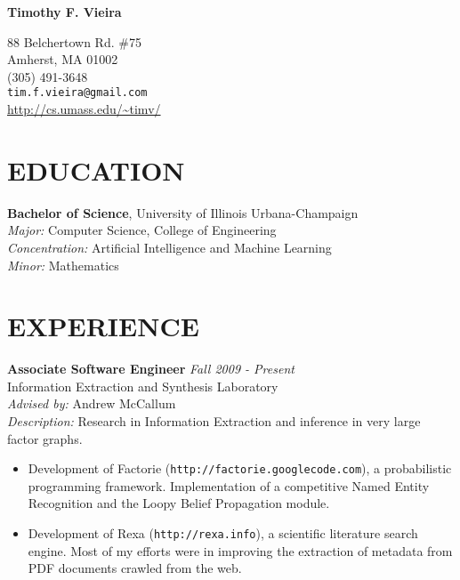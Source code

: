 \documentclass{report}
\newcommand{\centerheader}[1]{\moveleft.5\hoffset\centerline{#1}}
\begin{document}
{
  {\vskip 0.2in}
  {\Large \bf Timothy F. Vieira} \\
  \vspace{-10pt}
  \par{88 Belchertown Rd. \#75 \\ 
    Amherst, MA 01002} \\
  (305) 491-3648 \\
  \texttt{tim.f.vieira@gmail.com} \\
  \url{http://cs.umass.edu/~timv/} \\
}

{\vskip 0.1in}



\section*{EDUCATION} 
{\bf Bachelor of Science}, University of Illinois Urbana-Champaign \\
{\sl Major:} Computer Science, College of Engineering \\
{\sl Concentration:} Artificial Intelligence and Machine Learning \\
{\sl Minor:} Mathematics

\section*{EXPERIENCE}
{\bf Associate Software Engineer} \hfill {\it Fall 2009 - Present} \\
Information Extraction and Synthesis Laboratory \\
{\sl Advised by:} Andrew McCallum \\
{\sl Description:} Research in Information Extraction and inference in very large factor graphs. 
\begin{itemize}
\item Development of Factorie (\texttt{http://factorie.googlecode.com}), a probabilistic programming framework. Implementation of a competitive Named Entity Recognition and the Loopy Belief Propagation module. 
\item Development of Rexa (\texttt{http://rexa.info}), a scientific literature search engine. Most of my efforts were in improving the extraction of metadata from PDF documents crawled from the web.
\end{itemize}
\end{document}
